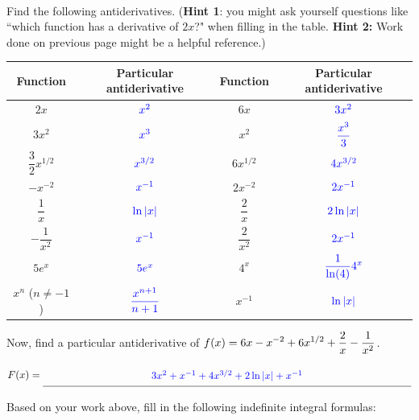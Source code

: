\documentclass[10pt]{article}
\begin{document}
\vfill
\newpage



\\

{\exercise} Find the following antiderivatives. ({\bf Hint 1}: you might ask yourself questions like ``which function has a derivative of $2x$?" when filling in the table. {\bf Hint 2:} Work done on previous page might be a helpful reference.)

\renewcommand{\arraystretch}{2}


\begin{center}
    \begin{tabularx}{6in}{ | C{1} | C{1} || C{1} | C{1} | }
    \hline
    Function & Particular antiderivative & Function & Particular antiderivative\\
    \hline
    $2x$ & ${\color{blue}x^2}$& $6x$ & ${\color{blue}3x^2}$ \\
    \hline
    $3x^2$ & ${\color{blue}x^3}$ & $x^2$ & ${\color{blue}\dfrac{x^3}{3}}$ \\
    \hline
    $\dfrac32x^{1/2}$ & ${\color{blue}x^{3/2}}$ & $6x^{1/2}$ &${\color{blue}4x^{3/2}}$ \\
    \hline
    $-x^{-2}$ &${\color{blue}x^{-1}}$ & $2x^{-2}$ &${\color{blue}2x^{-1}}$ \\
    \hline
    $\dfrac1x$ &${\color{blue}\ln|x|}$ & $\dfrac{2}{x}$ &${\color{blue}2\ln|x|}$ \\
    \hline
    $-\dfrac1{x^2}$ &${\color{blue}x^{-1}}$ & $\dfrac2{x^2}$ &${\color{blue}2x^{-1}}$ \\
    \hline
    $5e^x$ &${\color{blue}5e^x}$ & $ 4^x$ &${\color{blue}\dfrac{1}{\ln(4)} 4^x}$ \\
    \hline
      $x^n$ ($n\not=-1$) &${\color{blue}\dfrac{x^{n+1}}{n+1}}$ & $x^{-1}$ &${\color{blue}\ln|x|}$ \\
      \hline
    \end{tabularx}
\end{center}


Now, find a particular antiderivative of $\displaystyle f(x)=6x-x^{-2}+6x^{1/2}+\dfrac2x-\dfrac1{x^2}$.\\

\begin{center}
$F(x) = \unlineb{5}{ 3x^2 + x^{-1} + 4x^{3/2} + 2\ln|x| + x^{-1} }$
\end{center}
Based on your work above, fill in the following indefinite integral formulas:\\
\end{document}
